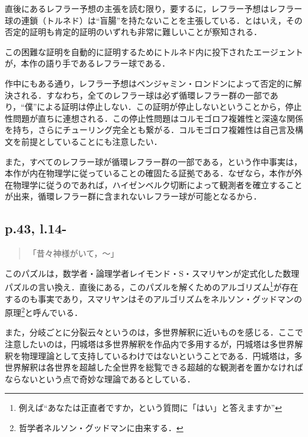 \documentclass[10pt, a5paper, twoside]{jsarticle}
\theoremstyle{definition}
\begin{document}
                直後にあるレフラー予想の主張を読む限り，要するに，レフラー予想はレフラー球の連鎖（トルネド）は“盲腸”を持たないことを主張している．とはいえ，その否定的証明も肯定的証明のいずれも非常に難しいことが察知される．

                この困難な証明を自動的に証明するためにトルネド内に投下されたエージェントが，本作の語り手であるレフラー球である．

                作中にもある通り，レフラー予想はベンジャミン・ロンドンによって否定的に解決される．すなわち，全てのレフラー球は必ず循環レフラー群の一部であり，“僕”による証明は停止しない．この証明が停止しないということから，停止性問題が直ちに連想される．この停止性問題はコルモゴロフ複雑性と深遠な関係を持ち，さらにチューリング完全とも繋がる．コルモゴロフ複雑性は自己言及構文を前提としていることにも注意したい．

                また，すべてのレフラー球が循環レフラー群の一部である，という作中事実は，本作が内在物理学に従っていることの確固たる証拠である．なぜなら，本作が外在物理学に従うのであれば，ハイゼンベルク切断によって観測者を確立することが出来，循環レフラー群に含まれないレフラー球が可能となるから．

            \subsection{p.43, l.14-}

                \begin{quote}

                    「昔々神様がいて，〜」

                \end{quote}

                このパズルは，数学者・論理学者レイモンド・S・スマリヤンが定式化した数理パズルの言い換え．直後にある，このパズルを解くためのアルゴリズム\footnote{例えば“あなたは正直者ですか，という質問に「はい」と答えますか”}が存在するのも事実であり，スマリヤンはそのアルゴリズムをネルソン・グッドマンの原理\footnote{哲学者ネルソン・グッドマンに由来する．}と呼んでいる\cite{sum}．

                また，分岐ごとに分裂云々というのは，多世界解釈に近いものを感じる．ここで注意したいのは，円城塔は多世界解釈を作品内で多用するが，円城塔は多世界解釈を物理理論として支持しているわけではないということである．円城塔は，多世界解釈は各世界を超越した全世界を総覧できる超越的な観測者を置かなければならないという点で奇妙な理論であるとしている．
\end{document}
